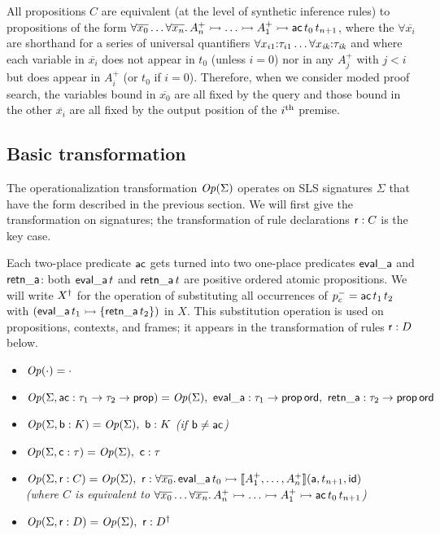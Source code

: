 All propositions $C$ are equivalent (at the level of synthetic
inference rules) to propositions of the form $\forall
\overline{x_0}\ldots \forall \overline{x_n}.\,A^+_n \rightarrowtail \ldots
\rightarrowtail A^+_1 \rightarrowtail {\sf ac}\,t_{0}\,t_{n+1}$, where the $\forall
\overline{x_i}$ are shorthand for a series of universal quantifiers
$\forall {x_{i1}}{:}{\tau_{i1}} \ldots \forall {x_{\it
    ik}}{:}{\tau_{\it ik}}$ and where each variable in
$\overline{x_i}$ does not appear in $t_0$ (unless $i = 0$) nor in any
$A^+_j$ with $j < i$ but does appear in $A^+_i$ (or $t_0$ if $i =
0$). Therefore, when we consider moded proof search, the variables
bound in $\overline{x_0}$ are all fixed by the query and those bound
in the other $\overline{x_i}$ are all fixed by the output position of
the $i^{\rm th}$ premise.

\subsection{Basic transformation}
\label{sec:trans-basic}

The operationalization transformation ${\it Op}({\Sigma})$
operates on SLS signatures $\Sigma$ that have the form described in the
previous section. We
will first give the transformation on signatures; the transformation
of rule declarations ${\sf r} : C$ is the key case.

Each two-place predicate ${\sf ac}$ gets turned into two one-place
predicates ${\sf eval\_a}$ and ${\sf retn\_a}$: both ${\sf
  eval\_a}\,t$ and ${\sf retn\_a}\,t$ are positive ordered atomic
propositions.  We will write ${{X}^\dag}$ for the operation of
substituting all occurrences of $p^-_c = {\sf ac}\,t_1\,t_2$ with
$({\sf eval\_a}\,t_1 \rightarrowtail \{ {\sf retn\_a}\,t_2 \})$ in $X$. This
substitution operation is used on propositions, contexts, and frames;
it appears in the transformation of rules ${\sf r} : D$ below.

\begin{itemize}
\item ${\it Op}({\cdot}) = \cdot$
\item ${\it Op}({\Sigma, {\sf ac} : \tau_1 \rightarrow \tau_2
    \rightarrow {\sf prop}}) = {\it Op}({\Sigma}), ~ {\sf eval\_a} :
  \tau_1 \rightarrow {\sf prop\,ord}, ~ {\sf retn\_a} : \tau_2
  \rightarrow {\sf prop\,ord}$ 
\item ${\it Op}({\Sigma, {\sf b} : K}) = {\it Op}({\Sigma}), ~ {\sf b}
  : K$ {\it (if ${\sf b} \neq {\sf ac}$)}
\item ${\it Op}({\Sigma, {\sf c} : \tau}) = {\it Op}({\Sigma}), ~ {\sf
    c} : \tau$ 
\item ${\it Op}({\Sigma, {\sf r} : C}) = {\it Op}({\Sigma}), ~ {\sf r}
  : \forall \overline{x_0}.\, {\sf eval\_a}\,t_0 \rightarrowtail 
      \llbracket {A^+_1, \ldots, A^+_n} \rrbracket({\sf a},{t_{n+1}},{\sf id})$ \\ {\it (where $C$ is
    equivalent to $\forall \overline{x_0}\ldots \forall
    \overline{x_n}.\, A^+_n \rightarrowtail \ldots \rightarrowtail A^+_1 \rightarrowtail {\sf
      ac}\,t_{0}\,t_{n+1}$)}
\item ${\it Op}({\Sigma, {\sf r} : D}) = {\it Op}({\Sigma}), ~ {\sf r}
  : {{D}^\dag}$
\end{itemize}

